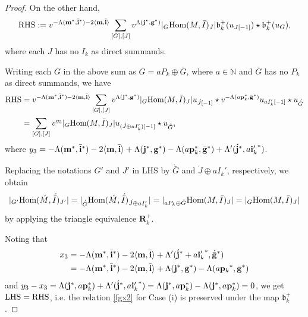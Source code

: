 \documentclass[reqno,12pt]{amsart}
\numberwithin{equation}{section}
\def\lr#1{\langle #1\rangle} \def\fin{\hfill$\square$}  \def\lra{\longrightarrow} \def\mod{\mbox{\rm \textbf{mod}}\,}\def\Mod{\mbox{\rm mod}\,}\def\top{\mbox{\rm top}\,}\def\soc{\mbox{\rm soc}\,}
\theoremstyle{plain} %
\theoremstyle{definition} %
\begin{document}
\begin{proof}
On the other hand,
\begin{align*}
{\rm RHS}:=v^{-\Lambda({\bf m}^\ast,{\bar{{\bf i}}}^\ast)-2\lr{{\bf m},\bar{{\bf i}}}}
\sum\limits_{[G],[J]}v^{\Lambda({{\bf j}}^\ast,{\bf g}^\ast)}|{}_{G}\Hom(M,\bar{I})_{J}|\mathfrak{b}_k^+(u_{J[-1]})\star \mathfrak{b}_k^+(u_G),\end{align*}
where each $J$ has no $I_k$ as direct summands.

Writing each $G$ in the above sum as $G=aP_k\oplus \bar{G}$, where $a\in\mathbb{N}$ and $\bar{G}$ has no $P_k$ as direct summands, we have
\begin{align*}{\rm RHS}&=v^{-\Lambda({\bf m}^\ast,{\bar{{\bf i}}}^\ast)-2\lr{{\bf m},\bar{{\bf i}}}}
\sum\limits_{[G],[J]}v^{\Lambda({{\bf j}}^\ast,{\bf g}^\ast)}|{}_{G}\Hom(M,\bar{I})_{J}|u_{\acute{J}[-1]}\star v^{-\Lambda(a{\bf p}_k^\ast,\bar{\bf g}^\ast)}u_{aI_k'[-1]}\star u_{\acute{\bar{G}}}\\
&=
\sum\limits_{[G],[J]}v^{y_3}|{}_{G}\Hom(M,\bar{I})_{J}|u_{(\acute{J}\oplus aI_k')[-1]}\star u_{\acute{\bar{G}}},
\end{align*}
where $y_3=-\Lambda({\bf m}^\ast,{\bar{{\bf i}}}^\ast)-2\lr{{\bf m},\bar{{\bf i}}}+\Lambda({{\bf j}}^\ast,{\bf g}^\ast)-\Lambda(a{\bf p}_k^\ast,\bar{\bf g}^\ast)+\Lambda'(\acute{{\bf j}}^\ast,a{{\bf i}'_k}^\ast)$.

Replacing the notations $G'$ and $J'$ in {\rm LHS} by $\acute{\bar{G}}$ and $\acute{J}\oplus aI_k'$, respectively,
we obtain
\[|_{G'}\mbox{\rm Hom}({\acute{M}},\acute{\bar{I}})_{J'}|=|_{\acute{\bar{G}}}\mbox{\rm Hom}({\acute{M}},\acute{\bar{I}})_{\acute{J}\oplus aI_k'}|=|_{aP_k\oplus \bar{G}}\mbox{\rm Hom}(M,\bar{I})_J|=|_G\mbox{\rm Hom}(M,\bar{I})_J|\]
by applying the  triangle equivalence $\mathbf{R}_k^+$.

Noting that \begin{align*}x_3&=-\Lambda({\bf m}^\ast,{\bar{{\bf i}}}^\ast)-2\lr{{\bf m},\bar{{\bf i}}}+\Lambda'(\acute{{\bf j}}^\ast+a{{\bf i}'_k}^\ast,\acute{\bar{{\bf g}}}^\ast)\\
&=-\Lambda({\bf m}^\ast,{\bar{{\bf i}}}^\ast)-2\lr{{\bf m},\bar{{\bf i}}}+\Lambda({\bf j}^\ast,\bar{{\bf g}}^\ast)-\Lambda(a{{\bf p}_k}^\ast,\bar{{\bf g}}^\ast)\end{align*}
and $y_3-x_3=\Lambda({{\bf j}}^\ast,a{\bf p}_k^\ast)+\Lambda'(\acute{{\bf j}}^\ast,a{{\bf i}'_k}^\ast)=\Lambda({{\bf j}}^\ast,a{\bf p}_k^\ast)-\Lambda({{\bf j}}^\ast,a{\bf p}_k^\ast)=0$, we get ${\rm LHS}={\rm RHS}$, i.e. the relation \eqref{fgx2} for Case (i) is preserved under the map $\mathfrak{b}_k^+$.



\end{proof}
\end{document}
